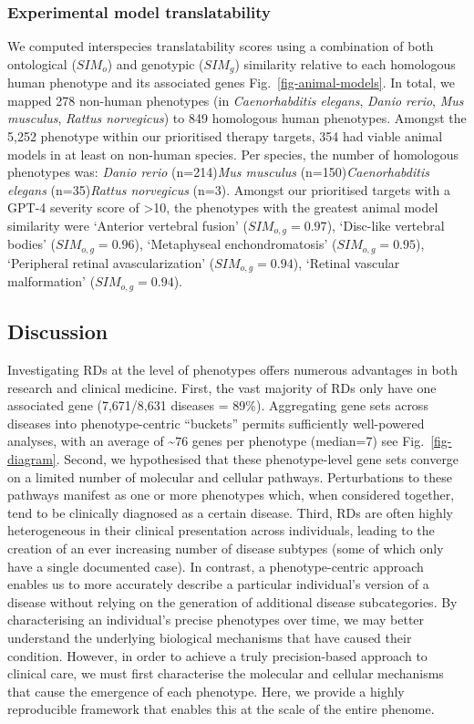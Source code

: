 \documentclass[
]{article}
\begin{document}
\subsubsection{Experimental model
translatability}\label{experimental-model-translatability}

We computed interspecies translatability scores using a combination of
both ontological (\(SIM_{o}\)) and genotypic (\(SIM_{g}\)) similarity
relative to each homologous human phenotype and its associated genes
Fig.~\ref{fig-animal-models}. In total, we mapped 278 non-human
phenotypes (in \emph{Caenorhabditis elegans}, \emph{Danio rerio},
\emph{Mus musculus}, \emph{Rattus norvegicus}) to 849 homologous human
phenotypes. Amongst the 5,252 phenotype within our prioritised therapy
targets, 354 had viable animal models in at least on non-human species.
Per species, the number of homologous phenotypes was: \emph{Danio rerio}
(n=214)\emph{Mus musculus} (n=150)\emph{Caenorhabditis elegans}
(n=35)\emph{Rattus norvegicus} (n=3). Amongst our prioritised targets
with a GPT-4 severity score of \textgreater10, the phenotypes with the
greatest animal model similarity were `Anterior vertebral fusion'
(\(SIM_{o,g}=0.97\)), `Disc-like vertebral bodies' (\(SIM_{o,g}=0.96\)),
`Metaphyseal enchondromatosis' (\(SIM_{o,g}=0.95\)), `Peripheral retinal
avascularization' (\(SIM_{o,g}=0.94\)), `Retinal vascular malformation'
(\(SIM_{o,g}=0.94\)).

\subsection{Discussion}\label{sec-discussion}

Investigating RDs at the level of phenotypes offers numerous advantages
in both research and clinical medicine. First, the vast majority of RDs
only have one associated gene (7,671/8,631 diseases = 89\%). Aggregating
gene sets across diseases into phenotype-centric ``buckets'' permits
sufficiently well-powered analyses, with an average of
\textasciitilde{}\(76\) genes per phenotype (median=7) see
Fig.~\ref{fig-diagram}. Second, we hypothesised that these
phenotype-level gene sets converge on a limited number of molecular and
cellular pathways. Perturbations to these pathways manifest as one or
more phenotypes which, when considered together, tend to be clinically
diagnosed as a certain disease. Third, RDs are often highly
heterogeneous in their clinical presentation across individuals, leading
to the creation of an ever increasing number of disease subtypes (some
of which only have a single documented case). In contrast, a
phenotype-centric approach enables us to more accurately describe a
particular individual's version of a disease without relying on the
generation of additional disease subcategories. By characterising an
individual's precise phenotypes over time, we may better understand the
underlying biological mechanisms that have caused their condition.
However, in order to achieve a truly precision-based approach to
clinical care, we must first characterise the molecular and cellular
mechanisms that cause the emergence of each phenotype. Here, we provide
a highly reproducible framework that enables this at the scale of the
entire phenome.
\end{document}

